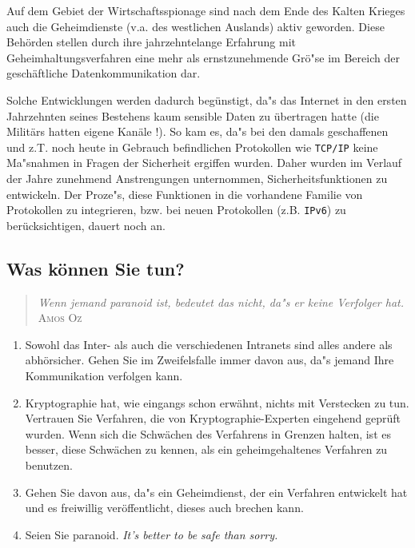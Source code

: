 Auf dem Gebiet der Wirtschaftsspionage sind nach dem Ende des Kalten
Krieges auch die Geheimdienste (v.a. des westlichen Auslands) aktiv
geworden. Diese Beh\"orden stellen durch ihre jahrzehntelange
Erfahrung mit Geheimhaltungsverfahren eine mehr als ernstzunehmende
Gr\"o"se im Bereich der gesch\"aftliche Datenkommunikation dar.

Solche Entwicklungen werden dadurch beg\"unstigt, da"s das Internet in
den ersten Jahrzehnten seines Bestehens kaum sensible Daten zu
\"ubertragen hatte (die Milit\"ars hatten eigene Kan\"ale !). So kam
es, da"s bei den damals geschaffenen und z.T. noch heute in Gebrauch
befindlichen Protokollen wie \texttt{TCP/IP} keine Ma"snahmen in
Fragen der Sicherheit ergiffen wurden.  Daher wurden im Verlauf der
Jahre zunehmend Anstrengungen unternommen, Sicherheitsfunktionen zu
entwickeln. Der Proze"s, diese Funktionen in die vorhandene Familie
von Protokollen zu integrieren, bzw. bei neuen Protokollen (z.B.
\texttt{IPv6}) zu ber\"ucksichtigen, dauert noch an.

\subsection{Was k\"onnen Sie tun?}

\begin{quote}
  \textit{Wenn jemand paranoid ist, bedeutet das nicht, da"s er keine Verfolger hat.} \\
  \textsc{Amos Oz}
\end{quote}

\begin{enumerate}
  
\item Sowohl das Inter- als auch die verschiedenen Intranets sind
  alles andere als abh\"orsicher. Gehen Sie im Zweifelsfalle immer
  davon aus, da"s jemand Ihre Kommunikation verfolgen kann.
  
\item Kryptographie hat, wie eingangs schon erw\"ahnt, nichts mit
  Verstecken zu tun.  Vertrauen Sie Verfahren, die von
  Kryptographie-Experten eingehend gepr\"uft wurden.  Wenn sich die
  Schw\"achen des Verfahrens in Grenzen halten, ist es besser, diese
  Schw\"achen zu kennen, als ein geheimgehaltenes Verfahren zu
  benutzen.
  
\item Gehen Sie davon aus, da"s ein Geheimdienst, der ein Verfahren
  entwickelt hat und es freiwillig ver\"offentlicht, dieses auch
  brechen kann.
  
\item Seien Sie paranoid. \textit{It's better to be safe than sorry.}

\end{enumerate}

